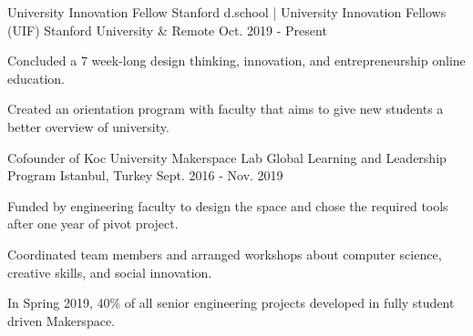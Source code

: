 \begin{cventries}
  \cvopenentry
    {University Innovation Fellow} %
    {Stanford d.school | University Innovation Fellows (UIF)} %
    {Stanford University \& Remote} %
    {Oct. 2019 - Present} %
    {
    \begin{cvitems} %
        \item {Concluded a 7 week-long design thinking, innovation, and entrepreneurship online education.}
        \item {Created an orientation program with faculty that aims to give new students a better overview of university.}
     \end{cvitems}
    }
  \cvopenentry
    {Cofounder of Koc University Makerspace Lab} %
    {Global Learning and Leadership Program} %
    {Istanbul, Turkey} %
    {Sept. 2016 - Nov. 2019} %
    {
      \begin{cvitems} %
        \item {Funded by engineering faculty to design the space and chose the required tools after one year of pivot project.}
        \item {Coordinated team members and arranged workshops about computer science, creative skills, and social innovation.}
        \item {In Spring 2019, 40\% of all senior engineering projects developed in fully student driven Makerspace.}

\end{cvitems}}
\end{cventries}

